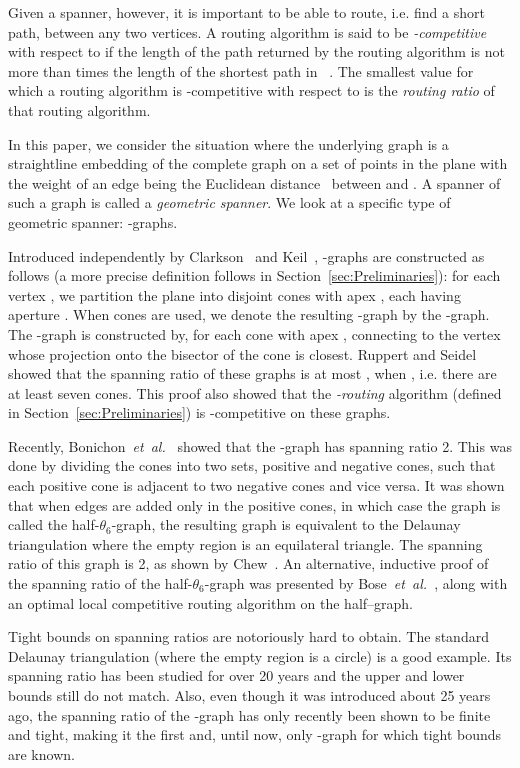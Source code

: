 \documentclass[12pt]{article}
\newcommand{\etal}{\emph{et~al.}\xspace}
\newcommand{\halfgraph}{half-\ensuremath{\theta_6}-graph\xspace}
\begin{document}
Given a spanner, however, it is important to be able to route, i.e. find a short path, between any two vertices. A routing algorithm is said to be \emph{-competitive} with respect to  if the length of the path returned by the routing algorithm is not more than  times the length of the shortest path in ~\cite{BFRV12}. The smallest value  for which a routing algorithm is -competitive with respect to  is the \emph{routing ratio} of that routing algorithm. 

In this paper, we consider the situation where the underlying graph  is a straightline embedding of the complete graph on a set of  points in the plane with the weight of an edge  being the Euclidean distance~ between  and . A spanner of such a graph is called a \emph{geometric spanner}. We look at a specific type of geometric spanner: -graphs. 

Introduced independently by Clarkson~\cite{Cl87} and Keil~\cite{Keil88}, -graphs are constructed as follows (a more precise definition follows in Section~\ref{sec:Preliminaries}): for each vertex , we partition the plane into  disjoint cones with apex , each having aperture . When  cones are used, we denote the resulting -graph by the -graph. The -graph is constructed by, for each cone with apex , connecting  to the vertex  whose projection onto the bisector of the cone is closest. Ruppert and Seidel~\cite{RS91} showed that the spanning ratio of these graphs is at most , when , i.e. there are at least seven cones. This proof also showed that the \emph{-routing} algorithm (defined in Section~\ref{sec:Preliminaries}) is -competitive on these graphs. 

Recently, Bonichon~\etal~\cite{BGHI10} showed that the -graph has spanning ratio 2. This was done by dividing the cones into two sets, positive and negative cones, such that each positive cone is adjacent to two negative cones and vice versa. It was shown that when edges are added only in the positive cones, in which case the graph is called the \halfgraph, the resulting graph is equivalent to the Delaunay triangulation where the empty region is an equilateral triangle. The spanning ratio of this graph is 2, as shown by Chew~\cite{Chew89}. An alternative, inductive proof of the spanning ratio of the \halfgraph was presented by \mbox{Bose~\etal~\cite{BFRV12}}, along with an optimal local competitive routing algorithm on the half--graph. 

Tight bounds on spanning ratios are notoriously hard to obtain. The standard Delaunay triangulation (where the empty region is a circle) is a good example. Its spanning ratio has been studied for over 20 years and the upper and lower bounds still do not match. Also, even though it was introduced about 25 years ago, the spanning ratio of the -graph has only recently been shown to be finite and tight, making it the first and, until now, only -graph for which tight bounds are known. 
\end{document}
